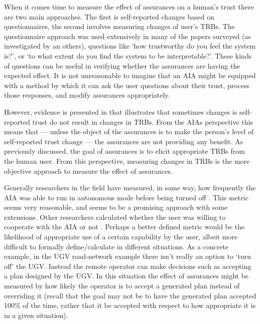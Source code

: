     When it comes time to measure the effect of assurances on a human's trust there are two main approaches. The first is self-reported changes based on questionnaires, the second involves measuring changes of user's TRBs. The questionnaire approach was used extensively in many of the papers surveyed (as investigated by \cite{Mcknight2011-gv,Muir1996-gt,Wickens1999-la,Salem2015-md,Kaniarasu2013-ho} an others), questions like `how trustworthy do you feel the system is?', or `to what extent do you find the system to be interpretable?'. These kinds of questions can be useful in verifying whether the assurances are having the expected effect. It is not unreasonable to imagine that an AIA might be equipped with a method by which it can ask the user questions about their trust, process those responses, and modify assurances appropriately.
    
    However, evidence is presented in \cite{Dzindolet2003-ts} that illustrates that sometimes changes is self-reported trust do not result in changes in TRBs. From the AIAs perspective this means that --- unless the object of the assurances is to make the person's level of self-reported trust change --- the assurances are not providing any benefit. As previously discussed, the goal of assurances is to elicit appropriate TRBs from the human user. From this perspective, measuring changes in TRBs is the more objective approach to measure the effect of assurances.

    Generally researchers in the field have measured, in some way, how frequently the AIA was able to run in autonomous mode before being turned off \cite{Freedy2007-sg,Desai2012-rc}. This metric seems very reasonable, and seems to be a promising approach with some extensions. Other researchers calculated whether the user was willing to cooperate with the AIA or not \cite{Salem2015-md,Wu2016-ei,Bainbridge2011-pl}. Perhaps a better defined metric would be the likelihood of appropriate use of a certain capability by the user, albeit more difficult to formally define/calculate in different situations. As a concrete example, in the UGV road-network example there isn't really an option to `turn off' the UGV. Instead the remote operator can make decisions such as accepting a plan designed by the UGV. In this situation the effect of assurances might be measured by how likely the operator is to accept a generated plan instead of overriding it (recall that the goal may not be to have the generated plan accepted 100\% of the time, rather that it be accepted with respect to how appropriate it is in a given situation).

